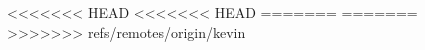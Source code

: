 \documentclass{nature}
\begin{document}
{\begin{figure}[tb]
\newpage
\appendix
%
%
%
%
<<<<<<< HEAD
<<<<<<< HEAD
=======
=======
>>>>>>> refs/remotes/origin/kevin

\end{figure}}
\end{document}
